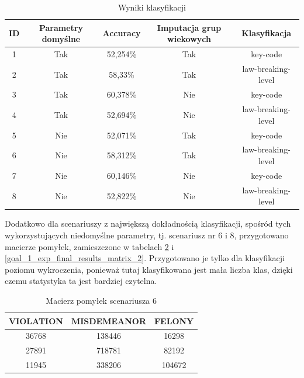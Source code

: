 \documentclass{classrep}
\begin{document}
{{{{                     \begin{table}
                     \small
                     \centering
                     \begin{tabular}{|c|c|c|c|c|}
                            \hline
                            ID & Parametry domyślne & Accuracy & Imputacja grup wiekowych & Klasyfikacja \\ \hline
                            1 & Tak  &  52,254\% & Tak & key-code\\ \hline
                            2 & Tak &  58,33\% & Tak & law-breaking-level\\ \hline
                            3 & Tak  &  60,378\% & Nie & key-code\\ \hline
                            4 & Tak &  52,694\% & Nie & law-breaking-level\\ \hline
                            5 & Nie  &  52,071\% & Tak & key-code\\ \hline
                            6 & Nie &  58,312\% & Tak & law-breaking-level\\ \hline
                            7 & Nie  &  60,146\% & Nie & key-code\\ \hline
                            8 & Nie &  52,822\% & Nie & law-breaking-level\\ \hline
                        \end{tabular}
                        \caption{Wyniki klasyfikacji}
                        \label{goal_1_exp_final_results}
                     \end{table}  
                     
                     Dodatkowo dla scenariuszy z największą dokładnością klasyfikacji, spośród tych wykorzystujących niedomyślne parametry, tj. scenariusz nr 6 i 8, przygotowano macierze pomyłek, zamieszczone w tabelach \ref{goal_1_exp_final_results_matrix_1} i \ref{goal_1_exp_final_results_matrix_2}. Przygotowano je tylko dla klasyfikacji poziomu wykroczenia, ponieważ tutaj klasyfikowana jest mała liczba klas, dzięki czemu statystyka ta jest bardziej czytelna.
                     
                     \begin{table}
                     \small
                     \centering
                     \begin{tabular}{|c|c|c|}
                            \hline
                            VIOLATION & MISDEMEANOR & FELONY\\ \hline
                           36768 & 138446 &  16298\\ \hline
                           27891 & 718781  & 82192\\ \hline
                           11945 & 338206 & 104672 \\ \hline
                        \end{tabular}
                        \caption{Macierz pomyłek scenariusza 6 }
                        \label{goal_1_exp_final_results_matrix_1}
                     \end{table}
                     
}}}}
\end{document}
